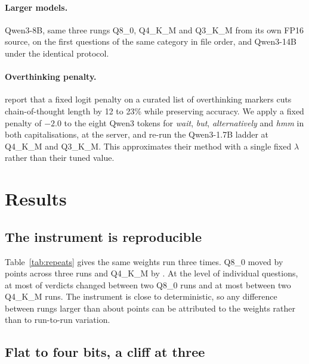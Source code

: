 \documentclass[11pt]{article}
\newcommand{\qm}{Qwen3-1.7B}
\begin{document}
\paragraph{Larger models.} Qwen3-8B, same three rungs Q8\_0, Q4\_K\_M and Q3\_K\_M from its own FP16 source, on the first \qtNEightB{} questions of the same category in file order, and Qwen3-14B under the identical protocol.

\paragraph{Overthinking penalty.} \citet{lotfi2026overthink} report that a fixed logit penalty on a curated list of overthinking markers cuts chain-of-thought length by 12 to 23\% while preserving accuracy. We apply a fixed penalty of $-2.0$ to the eight Qwen3 tokens for \emph{wait}, \emph{but}, \emph{alternatively} and \emph{hmm} in both capitalisations, at the server, and re-run the \qm{} ladder at Q4\_K\_M and Q3\_K\_M. This approximates their method with a single fixed $\lambda$ rather than their tuned value.

\section{Results}

\subsection{The instrument is reproducible}
\label{sec:repro}

Table~\ref{tab:repeats} gives the same weights run three times. Q8\_0 moved by \qtRepRangeEight{} points across three runs and Q4\_K\_M by \qtRepRangeFour{}. At the level of individual questions, at most \qtRepFlipsMaxEight{} of \qtN{} verdicts changed between two Q8\_0 runs and at most \qtRepFlipsMaxFour{} between two Q4\_K\_M runs. The instrument is close to deterministic, so any difference between rungs larger than about \qtMaxRepRange{} points can be attributed to the weights rather than to run-to-run variation.

\begin{table}[t]
\centering\small

\caption{Run-to-run variation with identical weights and settings, \texttt{simple\_python}, $n=\qtN{}$.}
\label{tab:repeats}
\end{table}

\subsection{Flat to four bits, a cliff at three}
\label{sec:ladder}
\end{document}
